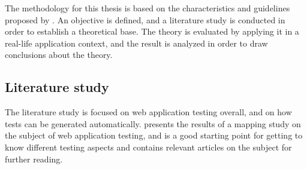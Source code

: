 The methodology for this thesis is based on the characteristics and
guidelines proposed by \citet{article:casestudies}. An objective is
defined, and a literature study is conducted in order to establish a
theoretical base. The theory is evaluated by applying it in a real-life
application context, and the result is analyzed in order to draw
conclusions about the theory.


\subsection{Literature study}

The literature study is focused on web application testing overall, and
on how tests can be generated automatically.
\citet{article:mappingstudy} presents the results of a mapping study on
the subject of web application testing, and is a good starting point for
getting to know different testing aspects and contains relevant articles
on the subject for further reading.
